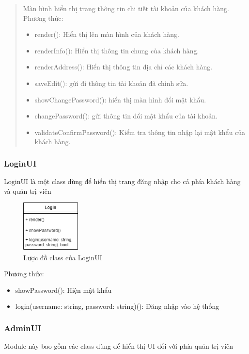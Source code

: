 \begin{quote}
    Màn hình hiển thị trang thông tin chi tiết tài khoản của khách hàng.\\
    Phương thức:
    \begin{itemize}
        \item render(): Hiển thị lên màn hình của khách hàng.
        \item renderInfo(): Hiển thị thông tin chung của khách hàng.
        \item renderAddress(): Hiển thị thông tin địa chỉ các khách hàng.
        \item saveEdit(): gửi đi thông tin tài khoản đã chỉnh sửa.
        \item showChangePassword(): hiển thị màn hình đổi mật khẩu.
        \item changePassword(): gửi thông tin đổi mật khẩu của tài khoản.
        \item validateConfirmPassword(): Kiểm tra thông tin nhập lại mật khẩu của khách hàng.
    \end{itemize}
 
\end{quote}
 
\subsubsection{LoginUI}
LoginUI là một class dùng để hiển thị trang đăng nhập cho cả phía khách hàng và quản trị viên
\begin{figure}[!htp]
    \begin{center}
        \includegraphics[width=3cm]{img/Architecture/UI/loginUI.png}
    \end{center}
    \caption{Lược đồ class của LoginUI}
\end{figure}
 
Phương thức:
\begin{itemize}
    \item showPassword(): Hiện mật khẩu
    \item login(username: string, password: string)(): Đăng nhập vào hệ thống
\end{itemize}
 
\subsubsection{AdminUI}
Module này bao gồm các class dùng để hiển thị UI đối với phía quản trị viên
 
